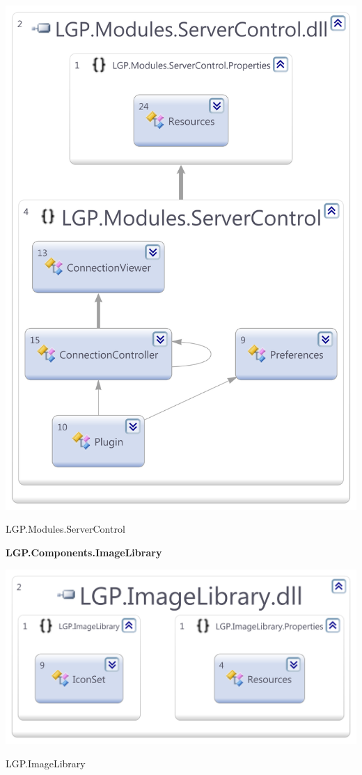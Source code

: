 \begin{multicols}{2}
			\begin{figurehere}
				\centering
				\includegraphics[scale=0.4]{pages/appendix3/figures/dllscreens/servercontrol.png}
				\caption{LGP.Modules.ServerControl}
			\end{figurehere}
	
	\end{multicols}
	
	
\newpage
	
	
	\large{\bfseries{LGP.Components.ImageLibrary}}
	\vspace{5mm}
	
		\begin{figurehere}
			\centering
			\includegraphics[scale=0.25]{pages/appendix3/figures/dllscreens/imagelibrary.png}
			\caption{LGP.ImageLibrary}
		\end{figurehere}
		

